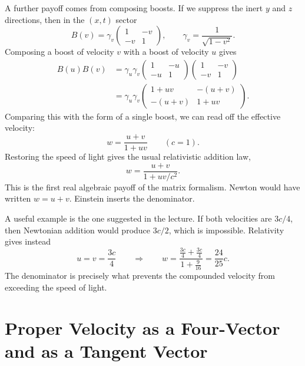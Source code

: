A further payoff comes from composing boosts. If we suppress the inert \(y\) and \(z\) directions, then in the \((x,t)\) sector
\begin{equation}
B(v)=\gamma_v
\begin{pmatrix}
1 & -v \\
-v & 1
\end{pmatrix},
\qquad
\gamma_v=\frac{1}{\sqrt{1-v^2}}.
\end{equation}
Composing a boost of velocity \(v\) with a boost of velocity \(u\) gives
\begin{align}
B(u)B(v)
&=
\gamma_u\gamma_v
\begin{pmatrix}
1 & -u \\
-u & 1
\end{pmatrix}
\begin{pmatrix}
1 & -v \\
-v & 1
\end{pmatrix} \\
&=
\gamma_u\gamma_v
\begin{pmatrix}
1+uv & -(u+v) \\
-(u+v) & 1+uv
\end{pmatrix}.
\end{align}
Comparing this with the form of a single boost, we can read off the effective velocity:
\begin{equation}
w=\frac{u+v}{1+uv}
\qquad (c=1).
\end{equation}
Restoring the speed of light gives the usual relativistic addition law,
\begin{equation}
w=\frac{u+v}{1+uv/c^2}.
\end{equation}
This is the first real algebraic payoff of the matrix formalism. Newton would have written \(w=u+v\). Einstein inserts the denominator.

A useful example is the one suggested in the lecture. If both velocities are \(3c/4\), then Newtonian addition would produce \(3c/2\), which is impossible. Relativity gives instead
\begin{equation}
u=v=\frac{3c}{4}
\qquad \Longrightarrow \qquad
w=\frac{\frac{3c}{4}+\frac{3c}{4}}{1+\frac{9}{16}}=\frac{24}{25}c.
\end{equation}
The denominator is precisely what prevents the compounded velocity from exceeding the speed of light.

\section{Proper Velocity as a Four-Vector and as a Tangent Vector}

